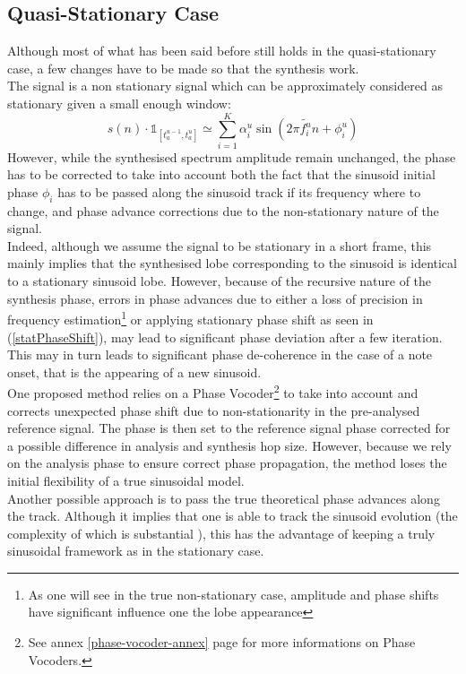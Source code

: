 \documentclass[]{article}
\begin{document}
\subsection{Quasi-Stationary Case}\label{quasi-stationary-case}
Although most of what has been said before still holds in the quasi-stationary case, a few changes have to be made so that the synthesis work.\\
The signal is a non stationary signal which can be approximately considered as stationary given a small enough window:
\begin{equation}
s(n)\cdot \mathds{1}_{[t_a^{u-1}, t_a^u]} \simeq \sum_{i=1}^{K}\alpha_i^{u} \sin(2\pi \tilde{f_i^{u}} n + \phi_{i}^u)
\end{equation}
However, while the synthesised spectrum amplitude remain unchanged, the phase has to be corrected to take into account both the fact that the sinusoid initial phase $\phi_i$ has to be passed along the sinusoid track if its frequency where to change, and phase advance corrections due to the non-stationary nature of the signal. \\
Indeed, although we assume the signal to be stationary in a short frame, this mainly implies that the synthesised lobe corresponding to the sinusoid is identical to a stationary sinusoid lobe. However, because of the recursive nature of the synthesis phase, errors in phase advances due to either a loss of precision in frequency estimation\footnote{As one will see in the true non-stationary case, amplitude and phase shifts have significant influence one the lobe appearance} or applying stationary phase shift as seen in (\ref{statPhaseShift}), may lead to significant phase deviation after a few iteration. This may in turn leads to significant phase de-coherence in the case of a note onset, that is the appearing of a new sinusoid.\\
One proposed method relies on a Phase Vocoder\footnote{See annex \ref{phase-vocoder-annex} page \pageref{phase-vocoder-annex} for more informations on Phase Vocoders.} to take into account and corrects unexpected phase shift due to non-stationarity in the pre-analysed reference signal. The phase is then set to the reference signal phase corrected for a possible difference in analysis and synthesis hop size. However, because we rely on the analysis phase to ensure correct phase propagation, the method loses the initial flexibility of a true sinusoidal model.\\
Another possible approach is to pass the true theoretical phase advances along the track. Although it implies that one is able to track the sinusoid evolution (the complexity of which is substantial \cite{mcaulay1986speech, serra1989system, karrer2006phavorit}), this has the advantage of keeping a truly sinusoidal framework as in the stationary case.\\
\end{document}
